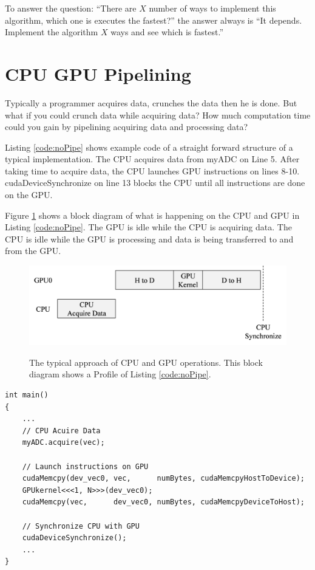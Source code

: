 To answer the question: ``There are $X$ number of ways to implement this algorithm, which one is executes the fastest?'' the answer always is ``It depends. Implement the algorithm $X$ ways and see which is fastest.''

\section{CPU GPU Pipelining}
Typically a programmer acquires data, crunches the data then he is done.
But what if you could crunch data while acquiring data? 
How much computation time could you gain by pipelining acquiring data and processing data?

Listing \ref{code:noPipe} shows example code of a straight forward structure of a typical implementation.
The CPU acquires data from myADC on Line 5.
After taking time to acquire data, the CPU launches GPU instructions on lines 8-10.
cudaDeviceSynchronize on line 13 blocks the CPU until all instructions are done on the GPU.

Figure \ref{fig:concurrentCPU_nonBlocking} shows a block diagram of what is happening on the CPU and GPU in Listing \ref{code:noPipe}.
The GPU is idle while the CPU is acquiring data.
The CPU is idle while the GPU is processing and data is being transferred to and from the GPU.
\begin{figure}
	\caption{The typical approach of CPU and GPU operations. This block diagram shows a Profile of Listing \ref{code:noPipe}.}
	\centering\includegraphics[width=8.77in/100*55]{figures/gpu_intro/concurrentCPU_nonBlocking.pdf}
	\label{fig:concurrentCPU_nonBlocking}
\end{figure}
\clearpage
\singlespacing
\begin{lstlisting}[style=myCUDAstyle,caption={Example code Simple example of the CPU acquiring data from myADC, copying from host to device, processing data on the device then copying from device to host. No processing occurs on device while CPU is acquiring data.},label={code:noPipe}]
int main()
{
	...
	// CPU Acuire Data
	myADC.acquire(vec);
	
	// Launch instructions on GPU 
	cudaMemcpy(dev_vec0, vec,      numBytes, cudaMemcpyHostToDevice);
	GPUkernel<<<1, N>>>(dev_vec0);
	cudaMemcpy(vec,      dev_vec0, numBytes, cudaMemcpyDeviceToHost);
	
	// Synchronize CPU with GPU
	cudaDeviceSynchronize();
	...
}
\end{lstlisting}
\doublespacing

